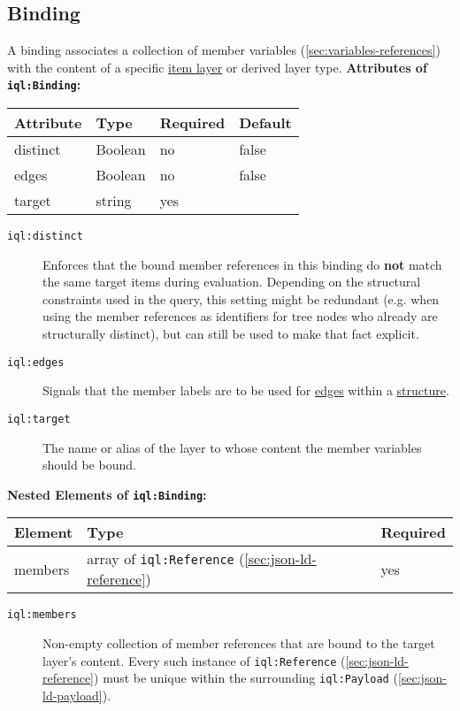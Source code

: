 \documentclass[11pt,a4paper,portrait]{article}
\newcommand{\iqlns}{iql:}
\newcommand{\repoUrl}{https://github.com/ICARUS-tooling/icarus2-modeling-framework/blob/dev/}
\newcommand{\modelsUrl}{\repoUrl icarus2-model-api/src/main/java/de/ims/icarus2/model/api/}
\newcommand{\repoLink}[2]{\href{#1}{#2}}
\newcommand{\iqlType}[1]{\texttt{\iqlns#1}}
\newcommand{\desc}[1]{\noindent#1\newline\medskip}
\newenvironment{attributes}[1]{
\noindent\textbf{Attributes of #1:}\newline\medskip
\begin{tabular}{|p{0.3\textwidth}|p{0.20\textwidth}|p{0.20\textwidth}|p{0.17\textwidth}|}
	\hline
	\textbf{Attribute} & \textbf{Type} & \textbf{Required} & \textbf{Default} \\ 
	\hline
	\hline
}{
\end{tabular}
}
\newcommand{\attribute}[4]{
	#1 & #2 & #3 & #4 \\
	\hline
}
\newenvironment{elements}[1]{
\noindent\textbf{Nested Elements of #1:}\newline\medskip
\begin{tabular}{|p{0.3\textwidth}|p{0.42\textwidth}|p{0.17\textwidth}|}
	\hline
	\textbf{Element} & \textbf{Type} & \textbf{Required} \\ 
	\hline
	\hline
}{
\end{tabular}
}
\newcommand{\element}[3]{
#1 & #2 & #3 \\
\hline
}
\begin{document}
\subsection{Binding}
\label{sec:json-ld-binding}
\desc{A binding associates a collection of member variables (\ref{sec:variables-references}) with the content of a specific \repoLink{\modelsUrl layer/ItemLayer.java}{item layer} or derived layer type.}
\begin{attributes}{\iqlType{Binding}}
	\attribute{distinct}{Boolean}{no}{false}
	\attribute{edges}{Boolean}{no}{false}
	\attribute{target}{string}{yes}{}
\end{attributes}
\begin{description}
	\item[\iqlType{distinct}] Enforces that the bound member references in this binding do \textbf{not} match the same target items during evaluation. Depending on the structural constraints used in the query, this setting might be redundant (e.g. when using the member references as identifiers for tree nodes who already are structurally distinct), but can still be used to make that fact explicit. 
	\item[\iqlType{edges}] Signals that the member labels are to be used for \repoLink{\modelsUrl members/item/Edge.java}{edges} within a \repoLink{\modelsUrl members/structure/Structure.java}{structure}.
	\item[\iqlType{target}] The name or alias of the layer to whose content the member variables should be bound.
\end{description}
\begin{elements}{\iqlType{Binding}}
	\element{members}{array of \iqlType{Reference} (\ref{sec:json-ld-reference})}{yes}
\end{elements}
\begin{description}
	\item[\iqlType{members}] Non-empty collection of member references that are bound to the target layer's content. Every such instance of \iqlType{Reference} (\ref{sec:json-ld-reference}) must be unique within the surrounding \iqlType{Payload} (\ref{sec:json-ld-payload}).
\end{description}
\end{document}
